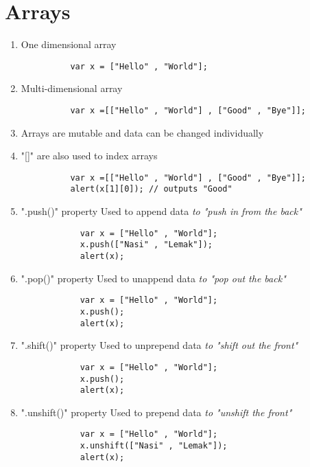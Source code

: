 \documentclass{article}
\begin{document}
  \section{Arrays}
    \begin{enumerate}
      \item One dimensional array
        \begin{lstlisting}
          var x = ["Hello" , "World"];
        \end{lstlisting}
      \item Multi-dimensional array
        \begin{lstlisting}
          var x =[["Hello" , "World"] , ["Good" , "Bye"]];
        \end{lstlisting}
      \item Arrays are mutable and data can be changed individually
      \item "[]" are also used to index arrays
        \begin{lstlisting}
          var x =[["Hello" , "World"] , ["Good" , "Bye"]];
          alert(x[1][0]); // outputs "Good"
        \end{lstlisting}
      \item ".push()" property
        Used to append data \emph{to "push in from the back"}
          \begin{lstlisting}
            var x = ["Hello" , "World"];
            x.push(["Nasi" , "Lemak"]);
            alert(x);
          \end{lstlisting}
      \item ".pop()" property
        Used to unappend data \emph{to "pop out the back"}
          \begin{lstlisting}
            var x = ["Hello" , "World"];
            x.push();
            alert(x);
          \end{lstlisting}
      \item ".shift()" property
        Used to unprepend data \emph{to "shift out the front"}
          \begin{lstlisting}
            var x = ["Hello" , "World"];
            x.push();
            alert(x);
          \end{lstlisting}
      \item ".unshift()" property
        Used to prepend data \emph{to "unshift the front"}
          \begin{lstlisting}
            var x = ["Hello" , "World"];
            x.unshift(["Nasi" , "Lemak"]);
            alert(x);
          \end{lstlisting}
    \end{enumerate}
\end{document}
